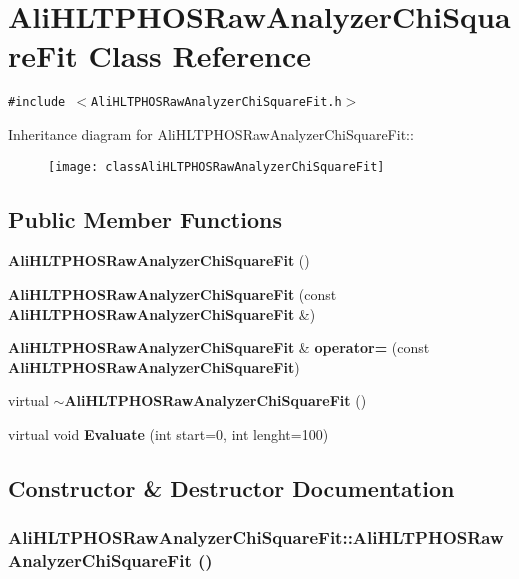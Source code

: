\section{Ali\-HLTPHOSRaw\-Analyzer\-Chi\-Square\-Fit Class Reference}
\label{classAliHLTPHOSRawAnalyzerChiSquareFit}
{\tt \#include $<$Ali\-HLTPHOSRaw\-Analyzer\-Chi\-Square\-Fit.h$>$}

Inheritance diagram for Ali\-HLTPHOSRaw\-Analyzer\-Chi\-Square\-Fit::\begin{figure}[H]
\begin{center}
\leavevmode
\texttt{[image: classAliHLTPHOSRawAnalyzerChiSquareFit]}
\end{center}
\end{figure}
\subsection*{Public Member Functions}
\begin{CompactItemize}
\item 
{\bf Ali\-HLTPHOSRaw\-Analyzer\-Chi\-Square\-Fit} ()
\item 
{\bf Ali\-HLTPHOSRaw\-Analyzer\-Chi\-Square\-Fit} (const {\bf Ali\-HLTPHOSRaw\-Analyzer\-Chi\-Square\-Fit} \&)
\item 
{\bf Ali\-HLTPHOSRaw\-Analyzer\-Chi\-Square\-Fit} \& {\bf operator=} (const {\bf Ali\-HLTPHOSRaw\-Analyzer\-Chi\-Square\-Fit})
\item 
virtual {\bf $\sim$Ali\-HLTPHOSRaw\-Analyzer\-Chi\-Square\-Fit} ()
\item 
virtual void {\bf Evaluate} (int start=0, int lenght=100)
\end{CompactItemize}


\subsection{Constructor \& Destructor Documentation}
\subsubsection{\setlength{\rightskip}{0pt plus 5cm}Ali\-HLTPHOSRaw\-Analyzer\-Chi\-Square\-Fit::Ali\-HLTPHOSRaw\-Analyzer\-Chi\-Square\-Fit ()}\label{classAliHLTPHOSRawAnalyzerChiSquareFit_a0}



